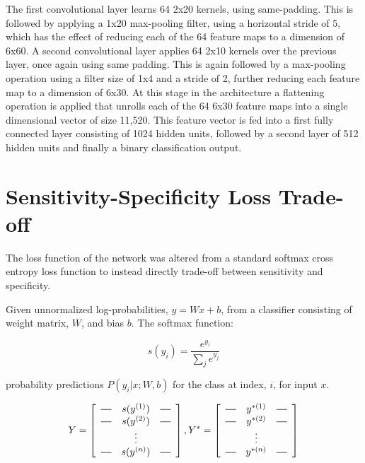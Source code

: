 \documentclass{article}
\newcommand*{\horzbar}{\rule[.5ex]{2.5ex}{0.5pt}}
\begin{document}
The first convolutional layer learns 64 2x20 kernels, using same-padding. This is followed by applying a 1x20 max-pooling filter, using a horizontal stride of 5, which has the effect of reducing each of the 64 feature maps to a dimension of 6x60. A second convolutional layer applies 64 2x10 kernels over the previous layer, once again using same padding. This is again followed by a max-pooling operation using a filter size of 1x4 and a stride of 2, further reducing each feature map to a dimension of 6x30. At this stage in the architecture a flattening operation is applied that unrolls each of the 64 6x30 feature maps into a single dimensional vector of size 11,520. This feature vector is fed into a first fully connected layer consisting of 1024 hidden units, followed by a second layer of 512 hidden units and finally a binary classification output. 

\section{Sensitivity-Specificity Loss Trade-off}
\label{sec:sesp}

The loss function of the network was altered from a standard softmax cross entropy loss function to instead directly trade-off between sensitivity and specificity.

Given unnormalized log-probabilities, $y = Wx + b$, from a classifier consisting of weight matrix, $W$, and bias $b$. The softmax function:

\begin{equation}
s(y_i) = \frac{e^{y_i}}{\sum\limits_j{e^{y_j}}}
\end{equation}

 probability predictions $P(y_i | x; W, b)$ for the class at index, $i$, for input $x$.


\[
Y =
\left[
  \begin{array}{ccc}
    \horzbar & s(y^{(1)}) & \horzbar \\
    \horzbar & s(y^{(2)}) & \horzbar \\
             & \vdots    &          \\
    \horzbar & s(y^{(n)}) & \horzbar
  \end{array}
\right]
,
Y^* =
\left[
  \begin{array}{ccc}
    \horzbar & y^{*(1)} & \horzbar \\
    \horzbar & y^{*(2)} & \horzbar \\
             & \vdots    &          \\
    \horzbar & y^{*(n)} & \horzbar
  \end{array}
\right]
\]
\end{document}
